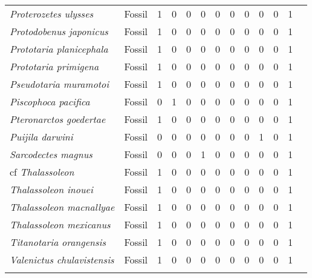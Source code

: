 \begin{longtable}{llccccccccccp{}}
\textit{Proterozetes ulysses} &
Fossil &
1 &
0 &
0 &
0 &
0 &
0 &
0 &
0 &
0 &
1 &
\\

\textit{Protodobenus japonicus} &
Fossil &
1 &
0 &
0 &
0 &
0 &
0 &
0 &
0 &
0 &
1 &
\\

\textit{Prototaria planicephala} &
Fossil &
1 &
0 &
0 &
0 &
0 &
0 &
0 &
0 &
0 &
1 &
\\

\textit{Prototaria primigena} &
Fossil &
1 &
0 &
0 &
0 &
0 &
0 &
0 &
0 &
0 &
1 &
\\

\textit{Pseudotaria muramotoi} &
Fossil &
1 &
0 &
0 &
0 &
0 &
0 &
0 &
0 &
0 &
1 &
\\

\textit{Piscophoca pacifica} &
Fossil &
0 &
1 &
0 &
0 &
0 &
0 &
0 &
0 &
0 &
1 &
\\

\textit{Pteronarctos goedertae} &
Fossil &
1 &
0 &
0 &
0 &
0 &
0 &
0 &
0 &
0 &
1 &
\\

\textit{Puijila darwini} &
Fossil &
0 &
0 &
0 &
0 &
0 &
0 &
0 &
1 &
0 &
1 &
\\

\textit{Sarcodectes magnus} &
Fossil &
0 &
0 &
0 &
1 &
0 &
0 &
0 &
0 &
0 &
1 &
\\

cf \textit{Thalassoleon}&
Fossil &
1 &
0 &
0 &
0 &
0 &
0 &
0 &
0 &
0 &
1 &
\\

\textit{Thalassoleon inouei} &
Fossil &
1 &
0 &
0 &
0 &
0 &
0 &
0 &
0 &
0 &
1 &
\\

\textit{Thalassoleon macnallyae} &
Fossil &
1 &
0 &
0 &
0 &
0 &
0 &
0 &
0 &
0 &
1 &
\\

\textit{Thalassoleon mexicanus} &
Fossil &
1 &
0 &
0 &
0 &
0 &
0 &
0 &
0 &
0 &
1 &
\\

\textit{Titanotaria orangensis} &
Fossil &
1 &
0 &
0 &
0 &
0 &
0 &
0 &
0 &
0 &
1 &
\\

\textit{Valenictus chulavistensis} &
Fossil &
1 &
0 &
0 &
0 &
0 &
0 &
0 &
0 &
0 &
1 &
\\
\hline

\label{table-biogeo-data}
\end{longtable}